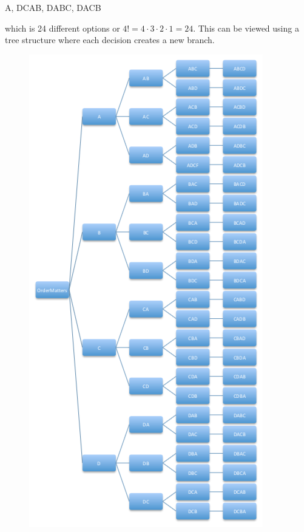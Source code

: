 \documentclass[10pt,]{book}
\numberwithin{equation}{section}
\begin{document}
A, DCAB, DABC, DACB%
\par
\hypertarget{p-370}{}%
which is 24 different options or \(4! = 4 \cdot 3 \cdot 2 \cdot 1 = 24\).  This can be viewed using a tree structure where each decision creates a new branch. \begin{figure}\centering\includegraphics[width=1\linewidth]{images/PermutationAllTree.png}
\end{figure}%
\end{document}
